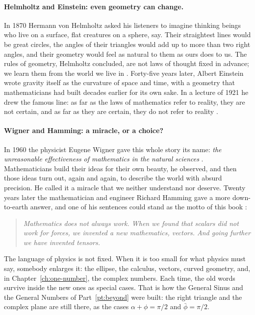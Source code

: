 \paragraph{Helmholtz and Einstein: even geometry can change.}
In 1870 Hermann von Helmholtz asked his listeners to imagine thinking beings who live on a surface, flat creatures on a sphere, say. Their straightest lines would be great circles, the angles of their triangles would add up to more than two right angles, and their geometry would feel as natural to them as ours does to us. The rules of geometry, Helmholtz concluded, are not laws of thought fixed in advance; we learn them from the world we live in \citep{Helmholtz1870}. Forty-five years later, Albert Einstein wrote gravity itself as the curvature of space and time, with a geometry that mathematicians had built decades earlier for its own sake. In a lecture of 1921 he drew the famous line: as far as the laws of mathematics refer to reality, they are not certain, and as far as they are certain, they do not refer to reality \citep{Einstein1921}.

\paragraph{Wigner and Hamming: a miracle, or a choice?}
In 1960 the physicist Eugene Wigner gave this whole story its name: \emph{the unreasonable effectiveness of mathematics in the natural sciences} \citep{Wigner1960}. Mathematicians build their ideas for their own beauty, he observed, and then those ideas turn out, again and again, to describe the world with absurd precision. He called it a miracle that we neither understand nor deserve. Twenty years later the mathematician and engineer Richard Hamming gave a more down-to-earth answer, and one of his sentences could stand as the motto of this book \citep{Hamming1980}:
\begin{quote}
\itshape Mathematics does not always work. When we found that scalars did not work for forces, we invented a new mathematics, vectors. And going further we have invented tensors.
\end{quote}

\begin{plainwords}
The language of physics is not fixed. When it is too small for what physics must say, somebody enlarges it: the ellipse, the calculus, vectors, curved geometry, and, in Chapter~\ref{ch:one-number}, the complex numbers. Each time, the old words survive inside the new ones as special cases. That is how the General Sinus and the General Numbers of Part~\ref{pt:beyond} were built: the right triangle and the complex plane are still there, as the cases $\alpha + \phi = \pi/2$ and $\bar{\phi} = \pi/2$.
\end{plainwords}

